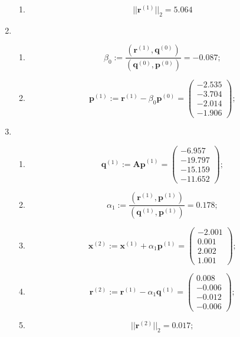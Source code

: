 \begin{enumerate}
\begin{enumerate}
        \item $$||\mathbf{r}^{(1)}||_2 = \mathbf{5.064}$$
    \end{enumerate}

    \item \begin{enumerate}
        \item $$\beta_0 :=
        \dfrac{(\mathbf{r}^{(1)}, \mathbf{q}^{(0)})}{(\mathbf{q}^{(0)}, \mathbf{p}^{(0)})} = -0.087;$$

        \item $$\mathbf{p}^{(1)} :=
        \mathbf{r}^{(1)}-\beta_0\mathbf{p}^{(0)} = \begin{pmatrix} -2.535\\-3.704\\-2.014\\-1.906 \end{pmatrix};$$
    \end{enumerate}

    \item \begin{enumerate}
        \item $$\mathbf{q}^{(1)} :=
        \mathbf{Ap}^{(1)} = \begin{pmatrix} -6.957\\-19.797\\-15.159\\-11.652 \end{pmatrix};$$

        \item $$\alpha_1 :=
        \dfrac{(\mathbf{r}^{(1)}, \mathbf{p}^{(1)})}{(\mathbf{q}^{(1)}, \mathbf{p}^{(1)})} = 0.178;$$

        \item $$\mathbf{x}^{(2)} :=
        \mathbf{x}^{(1)}+\alpha_1\mathbf{p}^{(1)} = \begin{pmatrix} -2.001\\0.001\\2.002\\1.001 \end{pmatrix};$$

        \item $$\mathbf{r}^{(2)} :=
        \mathbf{r}^{(1)}-\alpha_1\mathbf{q}^{(1)} = \begin{pmatrix} 0.008\\-0.006\\-0.012\\-0.006 \end{pmatrix};$$

        \item $$||\mathbf{r}^{(2)}||_2 = \mathbf{0.017};$$
    \end{enumerate}
\end{enumerate}

